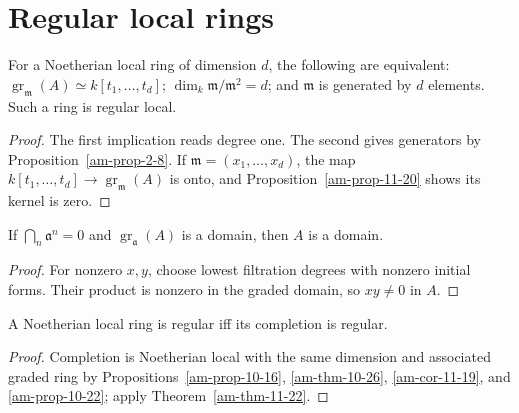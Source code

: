 \section{Regular local rings}
\label{am-ch11-regular}
\begin{theorem}
\label{am-thm-11-22}
\uses{}
For a Noetherian local ring of dimension $d$, the following are equivalent:
$\operatorname{gr}_\mathfrak{m}(A)\simeq k[t_1,\ldots,t_d]$;
$\dim_k\mathfrak{m}/\mathfrak{m}^2=d$; and $\mathfrak{m}$ is generated by $d$ elements.  Such a ring is
regular local.
\end{theorem}
\begin{proof}
The first implication reads degree one.  The second gives generators by
Proposition~\ref{am-prop-2-8}.  If $\mathfrak{m}=(x_1,\ldots,x_d)$, the map
$k[t_1,\ldots,t_d]\to\operatorname{gr}_\mathfrak{m}(A)$ is onto, and Proposition~\ref{am-prop-11-20}
shows its kernel is zero.
\end{proof}
\begin{lemma}
\label{am-lem-11-23}
\uses{}
If $\bigcap_n\mathfrak{a}^n=0$ and $\operatorname{gr}_\mathfrak{a}(A)$ is a domain, then
$A$ is a domain.
\end{lemma}
\begin{proof}
For nonzero $x,y$, choose lowest filtration degrees with nonzero initial forms.
Their product is nonzero in the graded domain, so $xy\ne0$ in $A$.
\end{proof}
\begin{proposition}
\label{am-prop-11-24}
\uses{}
A Noetherian local ring is regular iff its completion is regular.
\end{proposition}
\begin{proof}
Completion is Noetherian local with the same dimension and associated graded
ring by Propositions~\ref{am-prop-10-16}, \ref{am-thm-10-26},
\ref{am-cor-11-19}, and \ref{am-prop-10-22}; apply Theorem~\ref{am-thm-11-22}.
\end{proof}

